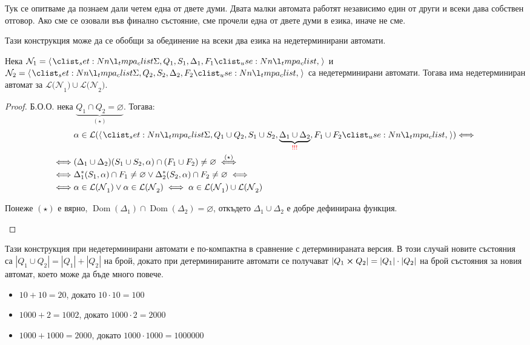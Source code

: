 Тук се опитваме да познаем дали четем една от двете думи.
Двата малки автомата работят независимо един от други и всеки дава собствен отговор.
Ако сме се озовали във финално състояние, сме прочели една от двете думи в езика, иначе не сме.

\pagebreak

Тази конструкция може да се обобщи за обединение на всеки два езика на недетерминирани автомати.

\begin{claim}
    Нека $\mathcal{N}_1 = \opair{\Sigma, Q_1, S_1, \Delta_1, F_1}$ и $\mathcal{N}_2 = \opair{\Sigma, Q_2, S_2, \Delta_2, F_2}$ са недетерминирани автомати.
    Тогава има недетерминиран автомат за $\mathcal{L(N}_1) \cup \mathcal{L(N}_2)$.
\end{claim}

\begin{proof}
    Б.О.О. нека $\underbrace{Q_1 \cap Q_2 = \varnothing}_{(\star)}$. Тогава:
    \begin{align*}
             & \alpha \in \mathcal{L}(\opair{\Sigma, Q_1 \cup Q_2, S_1 \cup S_2, \underbrace{\Delta_1 \cup \Delta_2}_{\textcolor{red}{!!!}}, F_1 \cup F_2}) {\iff} \\
        \iff & (\Delta_1 \cup \Delta_2)(S_1 \cup S_2, \alpha) \cap (F_1 \cup F_2) \neq \varnothing \stackrel{(\star)}{\iff}                                        \\
        \iff & \Delta_1^*(S_1, \alpha) \cap F_1 \neq \varnothing \lor \Delta_2^*(S_2, \alpha) \cap F_2 \neq \varnothing \iff                                       \\
        \iff & \alpha \in \mathcal{L(N}_1) \lor \alpha \in \mathcal{L(N}_2) \iff \alpha \in \mathcal{L(N}_1) \cup \mathcal{L(N}_2)
    \end{align*}
    \begin{remark}[\textcolor{red}{!!!}]
        Понеже $(\star)$ е вярно, $\operatorname{Dom}(\Delta_1) \cap \operatorname{Dom}(\Delta_2) = \varnothing$, откъдето $\Delta_1 \cup \Delta_2$ е добре дефинирана функция.
    \end{remark}
\end{proof}

Тази конструкция при недетерминирани автомати е по-компактна в сравнение с детерминираната версия.
В този случай новите състояния са $|Q_1 \cup Q_2| = |Q_1| + |Q_2|$ на брой,
докато при детерминираните автомати се получават $|Q_1 \crossproduct Q_2| = |Q_1| \cdot |Q_2|$ на брой състояния за новия автомат, което може да бъде много повече.

\begin{itemize}
    \item $10 + 10 = 20$, докато $10 \cdot 10 = 100$
    \item $1000 + 2 = 1002$, докато $1000 \cdot 2 = 2000$
    \item $1000 + 1000 = 2000$, докато $1000 \cdot 1000 = 1000000$
\end{itemize}
